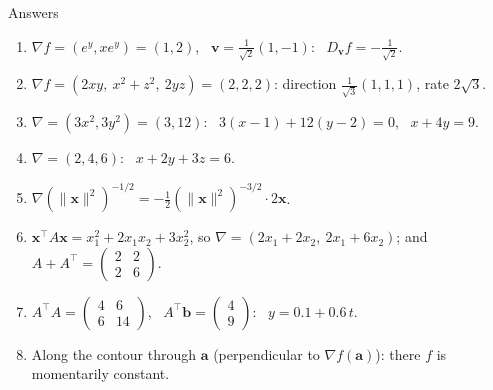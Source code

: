 \documentclass[10pt]{wosm-slides}
\newcommand{\norm}[1]{\lVert #1 \rVert}
\newcommand{\vx}{\mathbf{x}}
\newcommand{\va}{\mathbf{a}}
\newcommand{\vb}{\mathbf{b}}
\DeclareRobustCommand{\vv}{\mathbf{v}}
\begin{document}
\begin{frame}{Answers}
  \small
  \begin{enumerate}
    \item $\nabla f = (e^y, x e^y) = (1, 2)$, \ $\vv = \frac{1}{\sqrt2}(1, -1)$: \
      $D_\vv f = -\frac{1}{\sqrt2}$.
    \item $\nabla f = (2xy, \ x^2 + z^2, \ 2yz) = (2, 2, 2)$: direction $\frac{1}{\sqrt3}(1, 1, 1)$,
      rate $2\sqrt3$.
    \item $\nabla = (3x^2, 3y^2) = (3, 12)$: \ $3(x - 1) + 12(y - 2) = 0$, \ $x + 4y = 9$.
    \item $\nabla = (2, 4, 6)$: \ $x + 2y + 3z = 6$.
    \item $\nabla (\norm{\vx}^2)^{-1/2} = -\frac12 (\norm{\vx}^2)^{-3/2} \cdot 2\vx$.
    \item $\vx^\top A\vx = x_1^2 + 2x_1x_2 + 3x_2^2$, so $\nabla = (2x_1 + 2x_2, \ 2x_1 + 6x_2)$;
      and $A + A^\top = \begin{pmatrix} 2 & 2 \\ 2 & 6 \end{pmatrix}$.
    \item $A^\top A = \begin{pmatrix} 4 & 6 \\ 6 & 14 \end{pmatrix}$, \
      $A^\top \vb = \begin{pmatrix} 4 \\ 9 \end{pmatrix}$: \ $y = 0.1 + 0.6\, t$.
    \item Along the contour through $\va$ (perpendicular to $\nabla f(\va)$): there $f$ is
      momentarily constant.
  \end{enumerate}
\end{frame}

\end{document}

